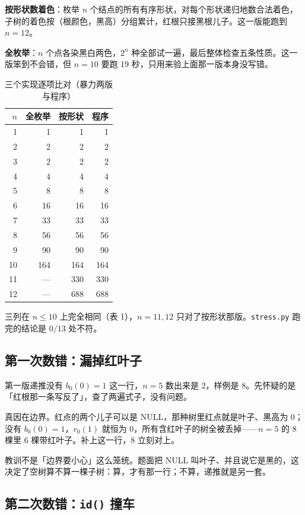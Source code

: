 \documentclass[12pt,a4paper,fontset=windows]{ctexart}
\newcommand{\code}[1]{\texttt{#1}}
\begin{document}
\textbf{按形状数着色}：枚举 $n$ 个结点的所有有序形状，对每个形状递归地数合法着色，子树的着色按（根颜色，黑高）分组累计，红根只接黑根儿子。这一版能跑到 $n=12$。

\textbf{全枚举}：$n$ 个点各染黑白两色，$2^n$ 种全部试一遍，最后整体检查五条性质。这一版笨到不会错，但 $n=10$ 要跑 19 秒，只用来验上面那一版本身没写错。

\begin{table}[htbp]
\centering
\caption{三个实现逐项比对（暴力两版与程序）}
\small
\begin{tabular}{rrrr}
\toprule
\rowcolor{gray!12}$n$ & 全枚举 & 按形状 & 程序 \\
\midrule
1 & 1 & 1 & 1 \\
2 & 2 & 2 & 2 \\
3 & 2 & 2 & 2 \\
4 & 4 & 4 & 4 \\
5 & 8 & 8 & 8 \\
6 & 16 & 16 & 16 \\
7 & 33 & 33 & 33 \\
8 & 56 & 56 & 56 \\
9 & 90 & 90 & 90 \\
10 & 164 & 164 & 164 \\
11 & --- & 330 & 330 \\
12 & --- & 688 & 688 \\
\bottomrule
\end{tabular}
\end{table}

三列在 $n\le 10$ 上完全相同（表 1），$n=11,12$ 只对了按形状那版。\code{stress.py} 跑完的结论是 $0/13$ 处不符。

\subsection{第一次数错：漏掉红叶子}

第一版递推没有 $b_0(0)=1$ 这一行，$n=5$ 数出来是 2，样例是 8。先怀疑的是「红根那一条写反了」，查了两遍式子，没有问题。

真因在边界。红点的两个儿子可以是 NULL，那种树里红点就是叶子、黑高为 0；没有 $b_0(0)=1$，$r_0(1)$ 就恒为 0，所有含红叶子的树全被丢掉——$n=5$ 的 8 棵里 6 棵带红叶子。补上这一行，8 立刻对上。

教训不是「边界要小心」这么笼统。题面把 NULL 叫叶子、并且说它是黑的，这决定了空树算不算一棵子树：算，才有那一行；不算，递推就是另一套。

\subsection{第二次数错：\code{id()} 撞车}
\end{document}
